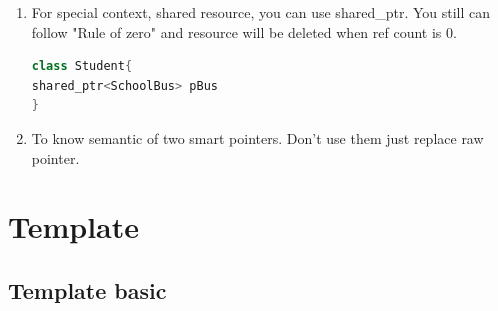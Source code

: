 \documentclass[a4paper,12pt,twoside]{book}
\begin{document}
\begin{itemize}
\begin{enumerate}
\item For special context, shared resource, you can use shared\_ptr.  You still can follow "Rule of zero" and resource will be deleted when ref count is 0.
\begin{lstlisting}[frame=single, language=c++]
class Student{
shared_ptr<SchoolBus> pBus
}
\end{lstlisting}

\item To know semantic of two smart pointers. Don't use them just replace raw pointer.
\end{enumerate}

\end{itemize}




\section{Template}
\subsection{Template basic}
\end{document}
